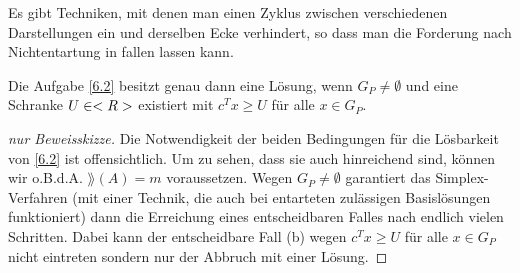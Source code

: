 Es gibt Techniken, mit denen man einen Zyklus zwischen verschiedenen Darstellungen ein und derselben Ecke verhindert, so dass man die Forderung nach Nichtentartung in  fallen lassen kann.

\begin{proposition}
	Die Aufgabe \cref{6.2} besitzt genau dann eine Lösung, wenn $G_P\neq\emptyset$ und eine Schranke $U\in<R>$ existiert mit $c^Tx\ge U$ für alle $x\in G_P$. 
\end{proposition}
\begin{proof}[nur Beweisskizze]
	Die Notwendigkeit der beiden Bedingungen für die Lösbarkeit von \cref{6.2} ist offensichtlich. Um zu sehen, dass sie auch hinreichend sind, können wir o.B.d.A. $\rang(A)=m$ voraussetzen. Wegen $G_P\neq\emptyset$ garantiert das Simplex-Verfahren (mit einer Technik, die auch bei entarteten zulässigen Basislösungen funktioniert) dann die Erreichung eines entscheidbaren Falles nach endlich vielen Schritten. Dabei kann der entscheidbare Fall (b) wegen $c^Tx\ge U$ für alle $x\in G_P$ nicht eintreten sondern nur der Abbruch mit einer Lösung. 
\end{proof}